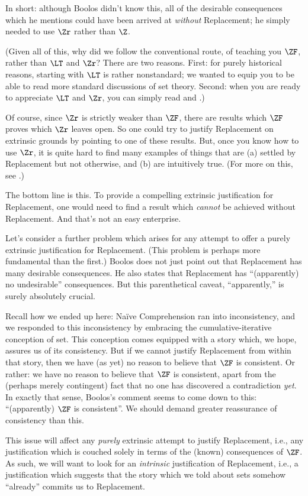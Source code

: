 \documentclass[../../../include/open-logic-section]{subfiles}
\begin{document}
In
short: although Boolos didn't know this, all of the desirable
consequences which he mentions could have been arrived at
\emph{without} Replacement; he simply needed to use $\Zr$ rather than $\Z$. 

(Given all of this, why did we follow the conventional route, of
teaching you $\ZF$, rather than $\LT$ and $\Zr$? There are two reasons. First: for purely historical reasons, starting with $\LT$ is rather nonstandard; we wanted to
equip you to be able to read more standard discussions of set theory. Second: when you are ready to
appreciate $\LT$ and $\Zr$, you can simply read \cite{Potter2004} and \cite{ButtonLT1}.)

Of course, since $\Zr$ is strictly weaker than $\ZF$, there are results which
$\ZF$ proves which $\Zr$ leaves open. So one could try to justify
Replacement on extrinsic grounds by pointing to one of these results.
But, once you know how to use $\Zr$, it is quite hard to find many
examples of things that are (a) settled by Replacement but not
otherwise, and (b) are intuitively true. (For more on this, see
\cite[\S13.2]{Potter2004}.)

The bottom line is this. To provide a compelling extrinsic
justification for Replacement, one would need to find a result which
\emph{cannot} be achieved without Replacement. And that's not an easy
enterprise. 

Let's consider a further problem which arises for any attempt to offer
a purely extrinsic justification for Replacement. (This problem is
perhaps more fundamental than the first.) Boolos does not just point
out that Replacement has many desirable consequences. He also states
that Replacement has ``(apparently) no undesirable'' consequences. But
this parenthetical caveat, ``apparently,'' is surely absolutely
crucial.

Recall how we ended up here: Na\"ive Comprehension ran into
inconsistency, and we responded to this inconsistency by embracing the
cumulative-iterative conception of set. This conception comes equipped
with a story which, we hope, assures us of its consistency. But if we
cannot justify Replacement from within that story, then we have (as
yet) no reason to believe that $\ZF$ is consistent. Or rather: we have
no reason to believe that $\ZF$ is consistent, apart from the (perhaps
merely contingent) fact that no one has discovered a contradiction
\emph{yet}. In exactly that sense, Boolos's comment seems to come down
to this: ``(apparently) $\ZF$ is consistent''. We should demand
greater reassurance of consistency than this. 

This issue will affect any \emph{purely} extrinsic attempt to justify
Replacement, i.e., any justification which is couched solely in terms
of the (known) consequences of $\ZF$. As such, we will want to look
for an \emph{intrinsic} justification of Replacement, i.e., a
justification which suggests that the story which we told about sets
somehow ``already'' commits us to Replacement. 
\end{document}
